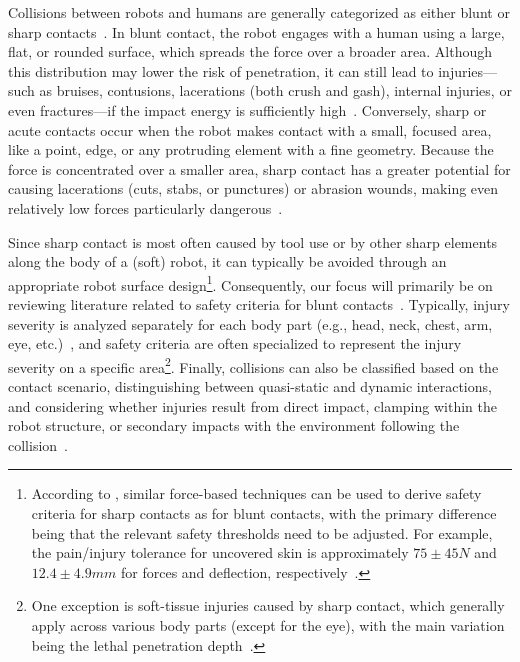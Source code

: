 Collisions between robots and humans are generally categorized as either blunt or sharp contacts~\citep{haddadin2009requirements, haddadin2011safe, haddadin2013towards}. In blunt contact, the robot engages with a human using a large, flat, or rounded surface, which spreads the force over a broader area. Although this distribution may lower the risk of penetration, it can still lead to injuries—such as bruises, contusions, lacerations (both crush and gash), internal injuries, or even fractures—if the impact energy is sufficiently high~\citep{haddadin2009requirements, haddadin2011safe, haddadin2013towards}. Conversely, sharp or acute contacts occur when the robot makes contact with a small, focused area, like a point, edge, or any protruding element with a fine geometry. Because the force is concentrated over a smaller area, sharp contact has a greater potential for causing lacerations (cuts, stabs, or punctures) or abrasion wounds, making even relatively low forces particularly dangerous~\citep{haddadin2010soft, haddadin2011study}.

Since sharp contact is most often caused by tool use or by other sharp elements along the body of a (soft) robot, it can typically be avoided through an appropriate robot surface design\footnote{According to \citet{haddadin2011study}, similar force-based techniques can be used to derive safety criteria for sharp contacts as for blunt contacts, with the primary difference being that the relevant safety thresholds need to be adjusted. For example, the pain/injury tolerance for uncovered skin is approximately $75 \pm 45 \si{N}$ and $12.4 \pm 4.9 \si{mm}$ for forces and deflection, respectively~\citep{haddadin2010soft, haddadin2011study}.}. Consequently, our focus will primarily be on reviewing literature related to safety criteria for blunt contacts~\citep{haddadin2011study, haddadin2013towards}. Typically, injury severity is analyzed separately for each body part (e.g., head, neck, chest, arm, eye, etc.)~\citep{haddadin2008collision, haddadin2013towards}, and safety criteria are often specialized to represent the injury severity on a specific area\footnote{One exception is soft-tissue injuries caused by sharp contact, which generally apply across various body parts (except for the eye), with the main variation being the lethal penetration depth~\citep{haddadin2010soft, haddadin2011study}.}. Finally, collisions can also be classified based on the contact scenario, distinguishing between quasi-static and dynamic interactions, and considering whether injuries result from direct impact, clamping within the robot structure, or secondary impacts with the environment following the collision~\citep{haddadin2009requirements, haddadin2011safe}.
%

